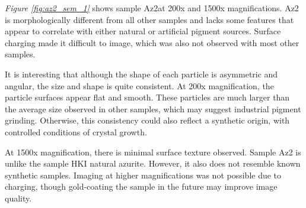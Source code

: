 \textit{Figure \ref{fig:az2_sem_1}} shows sample Az2at 200x and 1500x magnifications. Az2 is morphologically different from all other samples and lacks some features that appear to correlate with either natural or artificial pigment sources. Surface charging made it difficult to image, which was also not observed with most other samples.

It is interesting that although the shape of each particle is asymmetric and angular, the size and shape is quite consistent. At 200x magnification, the particle surfaces appear flat and smooth. These particles are much larger than the average size observed in other samples, which may suggest industrial pigment grinding. Otherwise, this consistency could also reflect a synthetic origin, with controlled conditions of crystal growth.

At 1500x magnification, there is minimal surface texture observed. Sample Az2 is unlike the sample HKI natural azurite. However, it also does not resemble known synthetic samples. Imaging at higher magnifications was not possible due to charging, though gold-coating the sample in the future may improve image quality.

